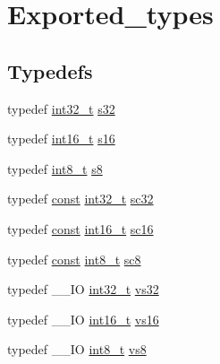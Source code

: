\hypertarget{group___exported__types}{\section{Exported\-\_\-types}
\label{group___exported__types}
}
\subsection*{Typedefs}
\begin{DoxyCompactItemize}
\item 
typedef \hyperlink{group___n_a_m_e_gafd12020da5a235dfcf0c3c748fb5baed}{int32\-\_\-t} \hyperlink{group___exported__types_gae9b1af5c037e57a98884758875d3a7c4}{s32}
\item 
typedef \hyperlink{stdint_8h_aa343fa3b3d06292b959ffdd4c4703b06}{int16\-\_\-t} \hyperlink{group___exported__types_gaa980e2c02ba2305e0f489d5650655425}{s16}
\item 
typedef \hyperlink{stdint_8h_ad566f6541e98b74246db1a3a3a85ad49}{int8\-\_\-t} \hyperlink{group___exported__types_ga9e382f207c65ca13ab4ae98363aeda80}{s8}
\item 
typedef \hyperlink{group___n_a_m_e_ga7ae6d0e43244213b34de2c2b9aa30da6}{const} \hyperlink{group___n_a_m_e_gafd12020da5a235dfcf0c3c748fb5baed}{int32\-\_\-t} \hyperlink{group___exported__types_gad97679599f3791409523fdb1c6156a28}{sc32}
\item 
typedef \hyperlink{group___n_a_m_e_ga7ae6d0e43244213b34de2c2b9aa30da6}{const} \hyperlink{stdint_8h_aa343fa3b3d06292b959ffdd4c4703b06}{int16\-\_\-t} \hyperlink{group___exported__types_ga66ab742a0751bb4e7661b8e874f2ddda}{sc16}
\item 
typedef \hyperlink{group___n_a_m_e_ga7ae6d0e43244213b34de2c2b9aa30da6}{const} \hyperlink{stdint_8h_ad566f6541e98b74246db1a3a3a85ad49}{int8\-\_\-t} \hyperlink{group___exported__types_ga30e6c0f6718e1b6d26dc9d94ddcf9d11}{sc8}
\item 
typedef \-\_\-\-\_\-\-I\-O \hyperlink{group___n_a_m_e_gafd12020da5a235dfcf0c3c748fb5baed}{int32\-\_\-t} \hyperlink{group___exported__types_ga476e2cb441f8e689433350ae2eeee510}{vs32}
\item 
typedef \-\_\-\-\_\-\-I\-O \hyperlink{stdint_8h_aa343fa3b3d06292b959ffdd4c4703b06}{int16\-\_\-t} \hyperlink{group___exported__types_ga19c9450d60abff7c6d3d35f31c10f83e}{vs16}
\item 
typedef \-\_\-\-\_\-\-I\-O \hyperlink{stdint_8h_ad566f6541e98b74246db1a3a3a85ad49}{int8\-\_\-t} \hyperlink{group___exported__types_ga9e5a203f00d2906af9466f68b4e72277}{vs8}

\end{DoxyCompactItemize}
